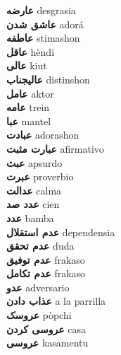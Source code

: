 \textbf{ عارضه  } desgrasia \\
\textbf{ عاشق شدن  } adorá \\
\textbf{ عاطفه  } stimashon \\
\textbf{ عاقل  } hèndi \\
\textbf{ عالی  } kiut \\
\textbf{ عالیجناب  } distinshon \\
\textbf{ عامل  } aktor \\
\textbf{ عامه  } trein \\
\textbf{ عبا  } mantel \\
\textbf{ عبادت  } adorashon \\
\textbf{ عبارت مثبت  } afirmativo \\
\textbf{ عبث  } apsurdo \\
\textbf{ عبرت  } proverbio \\
\textbf{ عدالت  } calma \\
\textbf{ عدد صد  } cien \\
\textbf{ عدد  } bamba \\
\textbf{ عدم استقلال  } dependensia \\
\textbf{ عدم تحقق  } duda \\
\textbf{ عدم توفیق  } frakaso \\
\textbf{ عدم تکامل  } frakaso \\
\textbf{ عدو  } adversario \\
\textbf{ عذاب دادن  } a la parrilla \\
\textbf{ عروسک  } pòpchi \\
\textbf{ عروسی کردن  } casa \\
\textbf{ عروسی  } kasamentu \\
